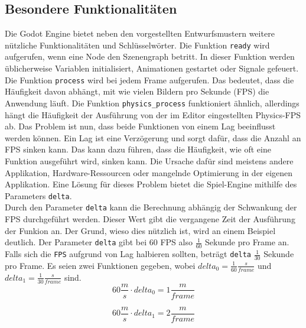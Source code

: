 \subsection{Besondere Funktionalitäten}
Die Godot Engine bietet neben den vorgestellten Entwurfsmustern weitere nützliche Funktionalitäten und Schlüsselwörter. Die Funktion \texttt{ready} wird aufgerufen, wenn eine Node den Szenengraph betritt. In dieser Funktion werden üblicherweise Variablen initialisiert, Animationen gestartet oder Signale gefeuert. \\

Die Funktion \texttt{process} wird bei jedem Frame aufgerufen. Das bedeutet, dass die Häufigkeit davon abhängt, mit wie vielen Bildern pro Sekunde (\ac{FPS}) die Anwendung läuft. Die Funktion \texttt{physics\_process} funktioniert ähnlich, allerdings hängt die Häufigkeit der Ausführung von der im Editor eingestellten Physics-\ac{FPS} ab. Das Problem ist nun, dass beide Funktionen von einem Lag beeinflusst werden können. Ein Lag ist eine Verzögerung und sorgt dafür, dass die Anzahl an \ac{FPS} sinken kann. Das kann dazu führen, dass die Häufigkeit, wie oft eine Funktion ausgeführt wird, sinken kann. Die Ursache dafür sind meistens andere Applikation, Hardware-Ressourcen oder mangelnde Optimierung in der eigenen Applikation. Eine Lösung für dieses Problem bietet die Spiel-Engine mithilfe des Parameters \texttt{delta}.\\

Durch den Parameter \texttt{delta} kann die Berechnung abhängig der Schwankung der \ac{FPS} durchgeführt werden. Dieser Wert gibt die vergangene Zeit der Ausführung der Funkion an. Der Grund, wieso dies nützlich ist, wird an einem Beispiel deutlich. Der Parameter \texttt{delta} gibt bei 60 \ac{FPS} also $\frac{1}{60}$ Sekunde pro Frame an. Falls sich die \texttt{FPS} aufgrund von Lag halbieren sollten, beträgt \texttt{delta} $\frac{1}{30}$ Sekunde pro Frame. Es seien zwei Funktionen gegeben, wobei $delta_0 = \frac{1}{60} \frac{s}{frame}$ und $delta_1 = \frac{1}{30} \frac{s}{frame}$ sind.\\

\setcounter{equation}{0}
\begin{equation}
    60 \frac{m}{s} \cdot delta_0 = 1 \frac{m}{frame}
\end{equation}

\begin{equation}
  60 \frac{m}{s} \cdot delta_1 = 2 \frac{m}{frame}
\end{equation}

